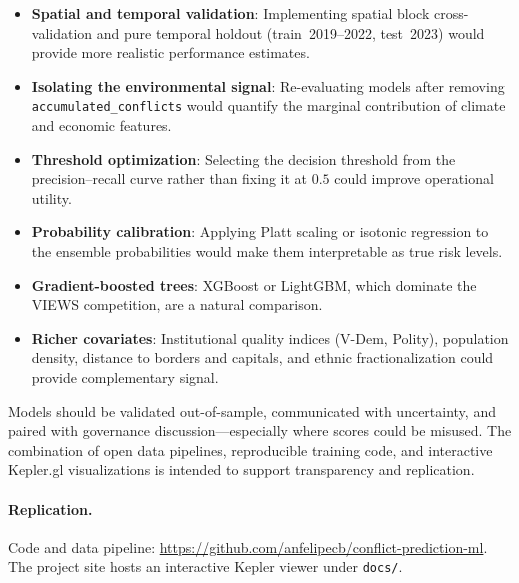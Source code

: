 \documentclass[11pt,a4paper]{article}
\begin{document}
\begin{itemize}
  \item \textbf{Spatial and temporal validation}: Implementing spatial block cross-validation \parencite{roberts2017crossvalidation} and pure temporal holdout (train~2019--2022, test~2023) would provide more realistic performance estimates.
  \item \textbf{Isolating the environmental signal}: Re-evaluating models after removing \texttt{accumulated\_conflicts} would quantify the marginal contribution of climate and economic features.
  \item \textbf{Threshold optimization}: Selecting the decision threshold from the precision--recall curve rather than fixing it at $0.5$ could improve operational utility.
  \item \textbf{Probability calibration}: Applying Platt scaling or isotonic regression to the ensemble probabilities would make them interpretable as true risk levels.
  \item \textbf{Gradient-boosted trees}: XGBoost or LightGBM, which dominate the VIEWS competition, are a natural comparison.
  \item \textbf{Richer covariates}: Institutional quality indices (V-Dem, Polity), population density, distance to borders and capitals, and ethnic fractionalization could provide complementary signal.
\end{itemize}

Models should be validated out-of-sample, communicated with uncertainty, and paired with governance discussion---especially where scores could be misused. The combination of open data pipelines, reproducible training code, and interactive Kepler.gl visualizations is intended to support transparency and replication.

\paragraph{Replication.}
Code and data pipeline:\linebreak
{\small\url{https://github.com/anfelipecb/conflict-prediction-ml}}. The project site hosts an interactive Kepler viewer under \texttt{docs/}.

\printbibliography
\end{document}
